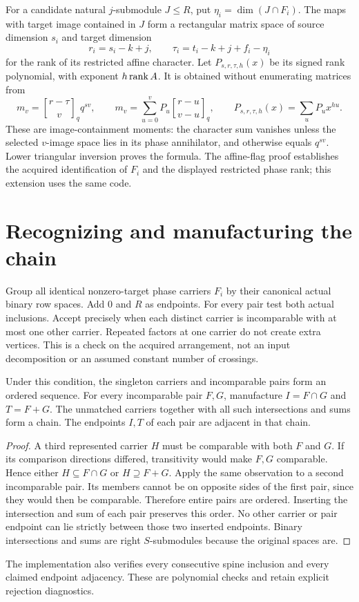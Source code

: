 \documentclass[11pt]{article}
\newcommand{\gb}[2]{{#1\brack #2}_q}
\begin{document}
For a candidate natural $j$-submodule $J\le R$, put
$\eta_i=\dim(J\cap F_i)$. The maps with target image contained in $J$ form
a rectangular matrix space of source dimension $s_i$ and target dimension
\[
 r_i=s_i-k+j,
 \qquad \tau_i=t_i-k+j+f_i-\eta_i
\]
for the rank of its restricted affine character. Let
$P_{s,r,\tau,h}(x)$ be its signed rank polynomial, with exponent
$h\operatorname{rank} A$. It is obtained without enumerating matrices from
\begin{equation}\label{eq:local-moments}
 m_v=\gb{r-\tau}{v}q^{sv},\qquad
 m_v=\sum_{u=0}^{v}P_u\gb{r-u}{v-u},\qquad
 P_{s,r,\tau,h}(x)=\sum_uP_ux^{hu}.
\end{equation}
These are image-containment moments: the character sum vanishes unless
the selected $v$-image space lies in its phase annihilator, and otherwise
equals $q^{sv}$. Lower triangular inversion proves the formula.
The affine-flag proof establishes the acquired identification of $F_i$ and
the displayed restricted phase rank; this extension uses the same code.

\section{Recognizing and manufacturing the chain}
Group all identical nonzero-target phase carriers $F_i$ by their canonical
actual binary row spaces. Add $0$ and $R$ as endpoints. For every pair test
both actual inclusions. Accept precisely when each distinct carrier is
incomparable with at most one other carrier. Repeated factors at one carrier
do not create extra vertices. This is a check on the acquired arrangement,
not an input decomposition or an assumed constant number of crossings.

\begin{lemma}\label{lem:chain}
Under this condition, the singleton carriers and incomparable pairs form
an ordered sequence. For every incomparable pair $F,G$, manufacture
$I=F\cap G$ and $T=F+G$. The unmatched carriers together with all such
intersections and sums form a chain. The endpoints $I,T$ of each pair are
adjacent in that chain.
\end{lemma}
\begin{proof}
A third represented carrier $H$ must be comparable with both $F$ and $G$.
If its comparison directions differed, transitivity would make $F,G$
comparable. Hence either $H\subseteq F\cap G$ or $H\supseteq F+G$.
Apply the same observation to a second incomparable pair. Its members
cannot be on opposite sides of the first pair, since they would then be
comparable. Therefore entire pairs are ordered. Inserting the intersection
and sum of each pair preserves this order. No other carrier or pair endpoint
can lie strictly between those two inserted endpoints. Binary intersections
and sums are right $S$-submodules because the original spaces are.
\end{proof}
The implementation also verifies every consecutive spine inclusion and
every claimed endpoint adjacency. These are polynomial checks and retain
explicit rejection diagnostics.
\end{document}
